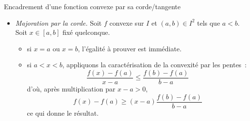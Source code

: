 \documentclass{article}
\begin{document}
{Encadrement d’une fonction convexe par sa corde/tangente}
	\begin{itemize}[label=$\vartriangleright$]
		\item \textit{Majoration par la corde.} Soit $f$ convexe sur $I$ et $(a,b)\in I^{2}$ tels que $a<b$. Soit $x\in [a,b]$ fixé quelconque.
		      \begin{itemize}
			      \item si $x=a$ ou $x=b$, l’égalité à prouver est immédiate.
			      \item si $a<x<b$, appliquons la caractérisation de la convexité par les pentes~:
			            \[
				            \frac{f(x)-f(a)}{x-a} \leq \frac{f(b)-f(a)}{b-a}
			            \]
			            d’où, après multiplication par $x-a>0$,
			            \[
				            f(x)-f(a) \geq (x-a)\frac{f(b)-f(a)}{b-a}
			            \]
			            ce qui donne le résultat.
		      \end{itemize}


\end{itemize}
\end{question_kholle}
\end{document}
